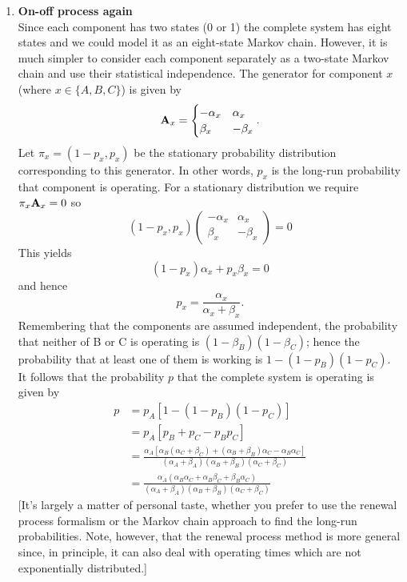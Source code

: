 \documentclass[11pt,a4paper]{article}
\begin{document}
  \begin{enumerate}
    \item \textbf{On-off process again}\\
    Since each component has two states (0 or 1) the complete system has eight states and we could model it as an eight-state Markov chain. However, it is much simpler to consider each component separately as a two-state Markov chain and use their statistical independence. The generator for component $x$ (where $x\in \{A, B, C\}$) is given by
    $$
    \vb{A}_x =
    \begin{cases}
      -\alpha_x & \alpha_x\\
      \beta_x & -\beta_x
    \end{cases}.
    $$
    Let $\pi_x = (1 - p_x, p_x)$ be the stationary probability distribution corresponding to this generator. In other words, $p_x$ is the long-run probability that component is operating. For a stationary distribution we require $\pi_x\vb{A}_x = 0$ so
    $$
    (1 - p_x, p_x)
    \begin{pmatrix}
      -\alpha_x & \alpha_x\\
      \beta_x & -\beta_x
    \end{pmatrix}
    = 0
    $$
    This yields
    $$
    (1 - p_x)\alpha_x + p_x\beta_x = 0
    $$
    and hence
    $$
    p_x = \frac{\alpha_x}{\alpha_x + \beta_x}.
    $$
    Remembering that the components are assumed independent, the probability that neither of B or C is operating is $(1 - \beta_B)(1 - \beta_C)$; hence the probability that at least one of them is working is $1 - (1 - p_B)(1 - p_C)$. It follows that the probability $p$ that the complete system is operating is given by
    \begin{align*}
      p
      &= p_A[1 - (1 - p_B)(1 - p_C)]\\
      &= p_A[p_B + p_C - p_Bp_C]\\
      &= \frac{\alpha_A[\alpha_B(\alpha_C + \beta_C) + (\alpha_B + \beta_B)\alpha_C - \alpha_B\alpha_C]}{(\alpha_A + \beta_A)(\alpha_B + \beta_B)(\alpha_C + \beta_C)}\\
      &= \frac{\alpha_A(\alpha_B\alpha_C + \alpha_B\beta_C + \beta_B\alpha_C)}{(\alpha_A + \beta_A)(\alpha_B + \beta_B)(\alpha_C + \beta_C)}
    \end{align*}
    [It's largely a matter of personal taste, whether you prefer to use the renewal process formalism or the Markov chain approach to find the long-run probabilities. Note, however, that the renewal process method is more general since, in principle, it can also deal with operating times which are not exponentially distributed.]

\end{enumerate}
\end{document}
